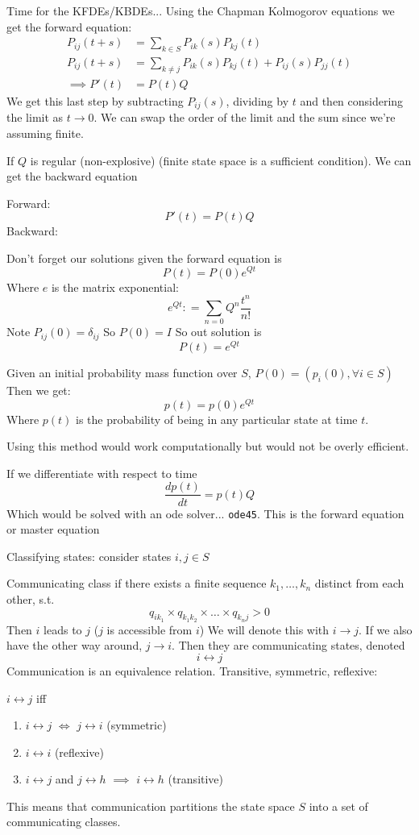 \documentclass{X:/Documents/Coding/Latex/myassignment}
\begin{document}
Time for the KFDEs/KBDEs... Using the Chapman Kolmogorov equations we get the forward equation:
\begin{align*}
P_{ij}(t+s) &= \sum_{k\in S} P_{ik}(s) P_{kj}(t)\\
P_{ij}(t+s)&= \sum_{k\neq j} P_{ik}(s) P_{kj}(t) + P_{ij}(s) P_{jj}(t)\\
\implies P'(t) &= P(t)Q
\end{align*}
We get this last step by subtracting $P_{ij}(s)$, dividing by $t$ and then considering the limit as $t\to 0$. We can swap the order of the limit and the sum since we're assuming finite.


If $Q$ is regular (non-explosive) (finite state space is a sufficient condition). We can get the backward equation

Forward:
\[P'(t) = P(t)Q\]
Backward:
\[\]


Don't forget our solutions given the forward equation is
\[P(t) = P(0) e^{Qt}\]
Where $e$ is the matrix exponential:
\[e^{Qt}: = \sum_{n=0} Q^n \frac{t^n}{n!}\]
Note $P_{ij}(0) = \delta_{ij}$ So $P(0) = I$
So out solution is
\[P(t) = e^{Qt}\]

Given an initial probability mass function over $S$, $P(0) = (p_i(0),\forall i\in S)$ Then we get:
\[p(t) = p(0)e^{Qt}\]
Where $p(t)$ is the probability of being in any particular state at time $t$.

Using this method would work computationally but would not be overly efficient.

If we differentiate with respect to time 
\[\frac{dp(t)}{dt} = p(t) Q\]
Which would be solved with an ode solver... \verb|ode45|. This is the forward equation or master equation


Classifying states: consider states $i,j \in S$ 


Communicating class if there exists a finite sequence $k_1,\hdots,k_n$ distinct from each other, s.t.
\[q_{ik_1} \times q_{k_1k_2} \times \hdots \times q_{k_n j} > 0\]
Then $i$ leads to $j$ ($j$ is accessible from $i$) We will denote this with $i\to j$.
If we also have the other way around, $j\to i$. Then they are communicating states, denoted
\[i\leftrightarrow j\]
Communication is an equivalence relation. Transitive, symmetric, reflexive:

$i\leftrightarrow j$ iff
\begin{enumerate}
    \item $i \leftrightarrow j$ $\Leftrightarrow$ $j\leftrightarrow i$ (symmetric)
    \item $i\leftrightarrow i$ (reflexive)
    \item $i\leftrightarrow j$ and $j\leftrightarrow h$ $\implies$ $i\leftrightarrow h$ (transitive)
\end{enumerate}
This means that communication partitions the state space $S$ into a set of communicating classes.
\end{document}
